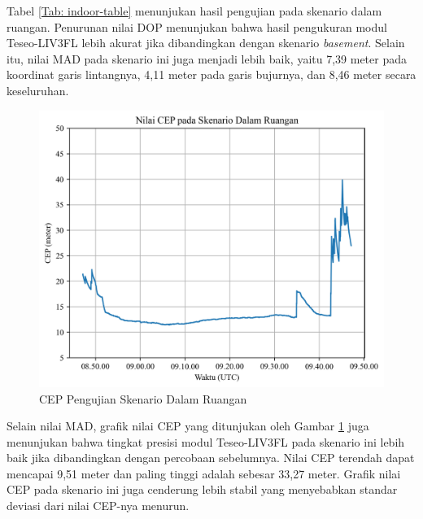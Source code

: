 Tabel \ref{Tab: indoor-table} menunjukan hasil pengujian pada skenario dalam ruangan. Penurunan nilai DOP menunjukan bahwa hasil pengukuran modul Teseo\hyp{}LIV3FL lebih akurat jika dibandingkan dengan skenario \textit{basement}. Selain itu, nilai MAD pada skenario ini juga menjadi lebih baik, yaitu 7,39 meter pada koordinat garis lintangnya, 4,11 meter pada garis bujurnya, dan 8,46 meter secara keseluruhan.

\begin{figure}[H]
	\centering
	\includegraphics[width=13cm]{contents/chapter-4/2-skenario-indoor/cep.png}
	\caption{CEP Pengujian Skenario Dalam Ruangan}
	\label{Fig: indoor-cep}
\end{figure}

Selain nilai MAD, grafik nilai CEP yang ditunjukan oleh Gambar \ref{Fig: indoor-cep} juga menunjukan bahwa tingkat presisi modul Teseo\hyp{}LIV3FL pada skenario ini lebih baik jika dibandingkan dengan percobaan sebelumnya. Nilai CEP terendah dapat mencapai 9,51 meter dan paling tinggi adalah sebesar 33,27 meter. Grafik nilai CEP pada skenario ini juga cenderung lebih stabil yang menyebabkan standar deviasi dari nilai CEP-nya menurun. 

